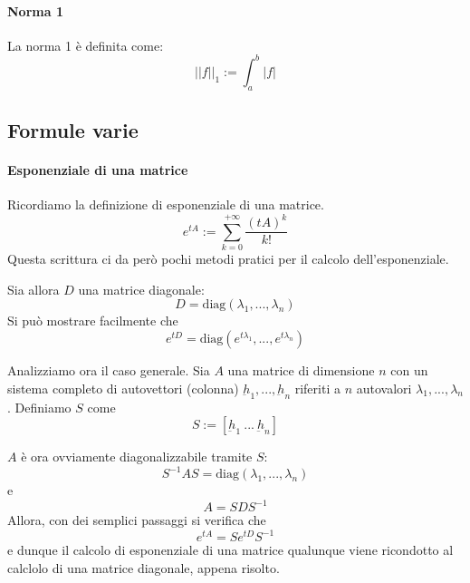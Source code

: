 \documentclass[a4paper,12pt]{article}
\begin{document}
\paragraph{Norma 1}
La norma 1 è definita come:
$$||f||_1 := \int_a^b|f|$$
\subsection{Formule varie}
\paragraph{Esponenziale di una matrice}
Ricordiamo la definizione di esponenziale di una matrice.
$$e^{tA} := \sum_{k=0}^{+\infty} \dfrac{(tA)^k}{k!}$$
Questa scrittura ci da però pochi metodi pratici per il calcolo dell'esponenziale.

Sia allora $D$ una matrice diagonale:
$$D=\text{diag}(\lambda_1,...,\lambda_n)$$
Si può mostrare facilmente che
$$e^{tD} = \text{diag}(e^{t\lambda_1}, ..., e^{t\lambda_n})$$

Analizziamo ora il caso generale.
Sia $A$ una matrice di dimensione $n$ con un sistema completo di autovettori (colonna) $\underbar{h}_1, ..., \underbar{h}_n$ riferiti a $n$ autovalori $\lambda_1, ..., \lambda_n$. Definiamo $S$ come
$$S:=[\underbar{h}_1\ ...\ \underbar{h}_n]$$

$A$ è ora ovviamente diagonalizzabile tramite $S$:
$$S^{-1}AS=\text{diag}(\lambda_1,...,\lambda_n)$$
e
$$A = SDS^{-1}$$
Allora, con dei semplici passaggi si verifica che
$$e^{tA} = Se^{tD}S^{-1}$$
e dunque il calcolo di esponenziale di una matrice qualunque viene ricondotto al calclolo di una matrice diagonale, appena risolto.
\end{document}
